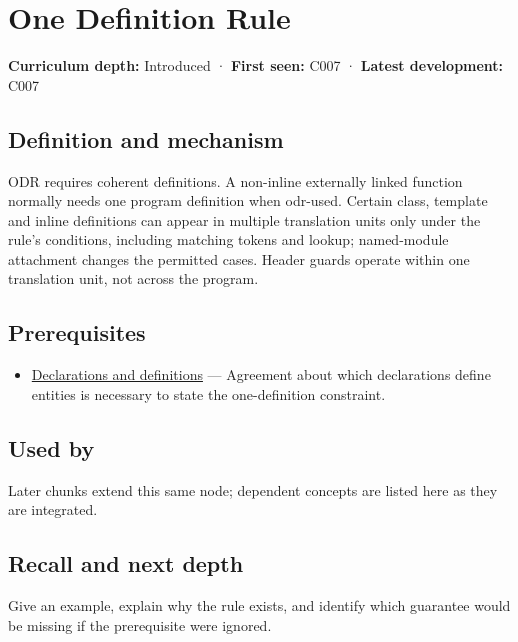 \hypertarget{appendix-49d27bc9d9a5}{}
\section{One Definition Rule}\label{appendix-49d27bc9d9a5-one-definition-rule}

\textbf{Curriculum depth:} Introduced · \textbf{First seen:} C007 · \textbf{Latest development:} C007

\subsection{Definition and mechanism}\label{appendix-49d27bc9d9a5-definition-and-mechanism}

ODR requires coherent definitions. A non-inline externally linked function normally needs one program definition when odr-used. Certain class, template and inline definitions can appear in multiple translation units only under the rule's conditions, including matching tokens and lookup; named-module attachment changes the permitted cases. Header guards operate within one translation unit, not across the program.

\subsection{Prerequisites}\label{appendix-49d27bc9d9a5-prerequisites}

\begin{itemize}
\tightlist
\item
  \hyperref[appendix-2e4d494c2d94]{Declarations and definitions} --- Agreement about which declarations define entities is necessary to state the one-definition constraint.
\end{itemize}

\subsection{Used by}\label{appendix-49d27bc9d9a5-used-by}

Later chunks extend this same node; dependent concepts are listed here as they are integrated.

\subsection{Recall and next depth}\label{appendix-49d27bc9d9a5-recall-and-next-depth}

Give an example, explain why the rule exists, and identify which guarantee would be missing if the prerequisite were ignored.

